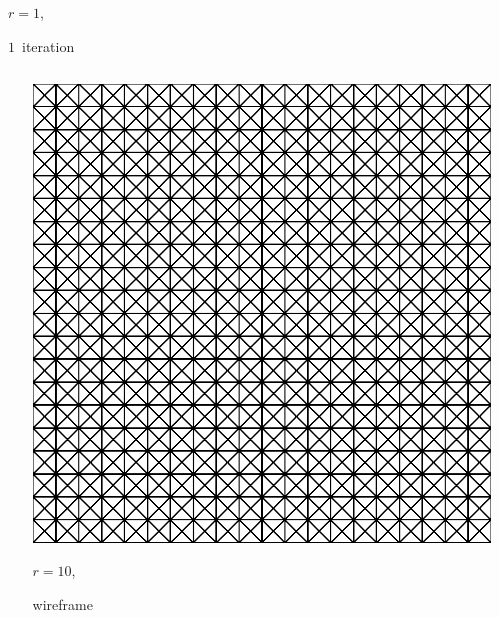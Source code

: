 \documentclass[aspectratio=169,t]{beamer}
\begin{document}
{\begin{columns}
\begin{column}{0.22\textwidth}
			{\footnotesize
				\par \vspace{-1mm} $r=1$,
				\par \vspace{-1mm} $1$~iteration
			}
		\end{column}
		\begin{column}{0.17\textwidth}~\end{column}
	\end{columns}
	\vspace*{4mm}
	\begin{columns}
		\begin{column}{0.17\textwidth}~\end{column}
		\begin{column}{0.22\textwidth}
			\centering
			\includegraphics[width=.85\textwidth]{data/synthetic_meshes/square_tesselation_4tri_Dirac_delta_10_v841_f1600_wireframe_2.png}
			{\footnotesize
				\par \vspace{-1mm} $r=10$,
				\par \vspace{-1mm} wireframe
			}
		\end{column}
		\begin{column}{0.22\textwidth}
			\centering

\end{column}
\end{columns}}
\end{document}
